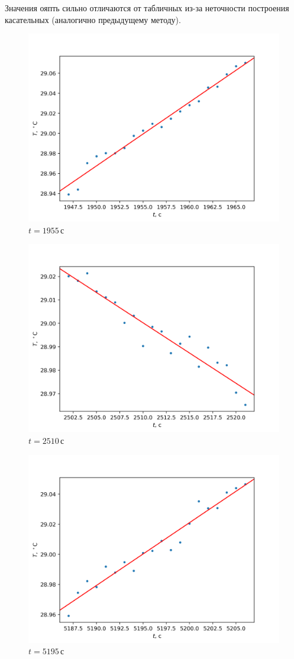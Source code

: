 \documentclass[a4paper, 12pt]{article}
\begin{document}
    Значения ояпть сильно отличаются от табличных из-за неточности
    построения касательных (аналогично предыдущему методу).

    \begin{figure}[ht!]
        \centering\includegraphics[width=0.6\linewidth]{img/1955.png}
        \caption{$t=1955\,\text{с}$}
    \end{figure}
    \begin{figure}[ht!]
        \centering\includegraphics[width=0.6\linewidth]{img/2510.png}
        \caption{$t=2510\,\text{с}$}
    \end{figure}
    \begin{figure}[ht!]
        \centering\includegraphics[width=0.6\linewidth]{img/5195.png}
        \caption{$t=5195\,\text{с}$}
    \end{figure}
\end{document}
